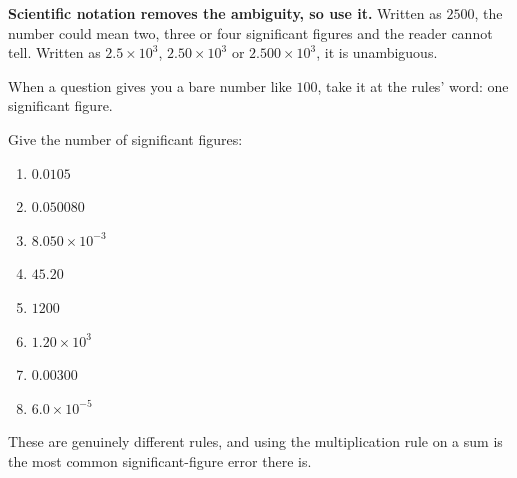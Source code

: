 \documentclass{apchem-notes}
\begin{document}
\begin{apctrap}
\textbf{Scientific notation removes the ambiguity, so use it.} Written as
$2500$, the number could mean two, three or four significant figures and
the reader cannot tell. Written as $2.5\times10^{3}$, $2.50\times10^{3}$ or
$2.500\times10^{3}$, it is unambiguous.

When a question gives you a bare number like $100$, take it at the rules'
word: one significant figure.
\end{apctrap}


Give the number of significant figures:

\begin{enumerate}[leftmargin=*,itemsep=0.3em]
  \item $0.0105$ 
  \item $0.050080$ 
  \item $8.050\times10^{-3}$ 
  \item $45.20$ 
  \item $1200$ 
  \item $1.20\times10^{3}$ 
  \item $0.00300$ 
  \item $6.0\times10^{-5}$ 
\end{enumerate}



\begin{center}
\end{center}

These are genuinely different rules, and using the multiplication rule on a
sum is the most common significant-figure error there is.
\end{document}
